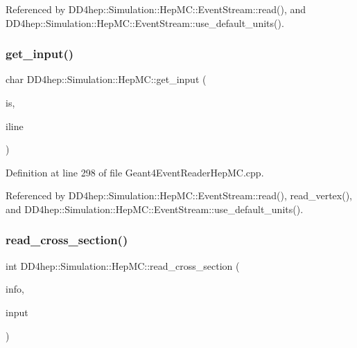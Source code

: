 Referenced by D\+D4hep\+::\+Simulation\+::\+Hep\+M\+C\+::\+Event\+Stream\+::read(), and D\+D4hep\+::\+Simulation\+::\+Hep\+M\+C\+::\+Event\+Stream\+::use\+\_\+default\+\_\+units().

\hypertarget{namespace_d_d4hep_1_1_simulation_1_1_hep_m_c_ae12e8ca37b7071f67c1810fa9420acad}{}\label{namespace_d_d4hep_1_1_simulation_1_1_hep_m_c_ae12e8ca37b7071f67c1810fa9420acad} 
\subsubsection{\texorpdfstring{get\+\_\+input()}{get\_input()}}
{\footnotesize\ttfamily char D\+D4hep\+::\+Simulation\+::\+Hep\+M\+C\+::get\+\_\+input (\begin{DoxyParamCaption}\item[{istream \&}]{is,  }\item[{istringstream \&}]{iline }\end{DoxyParamCaption})}



Definition at line 298 of file Geant4\+Event\+Reader\+Hep\+M\+C.\+cpp.



Referenced by D\+D4hep\+::\+Simulation\+::\+Hep\+M\+C\+::\+Event\+Stream\+::read(), read\+\_\+vertex(), and D\+D4hep\+::\+Simulation\+::\+Hep\+M\+C\+::\+Event\+Stream\+::use\+\_\+default\+\_\+units().

\hypertarget{namespace_d_d4hep_1_1_simulation_1_1_hep_m_c_a873025dee0b6f8a5ce8bd3485e518213}{}\label{namespace_d_d4hep_1_1_simulation_1_1_hep_m_c_a873025dee0b6f8a5ce8bd3485e518213} 
\subsubsection{\texorpdfstring{read\+\_\+cross\+\_\+section()}{read\_cross\_section()}}
{\footnotesize\ttfamily int D\+D4hep\+::\+Simulation\+::\+Hep\+M\+C\+::read\+\_\+cross\+\_\+section (\begin{DoxyParamCaption}\item[{\hyperlink{class_d_d4hep_1_1_simulation_1_1_hep_m_c_1_1_event_stream}{Event\+Stream} \&}]{info,  }\item[{istringstream \&}]{input }\end{DoxyParamCaption})}



